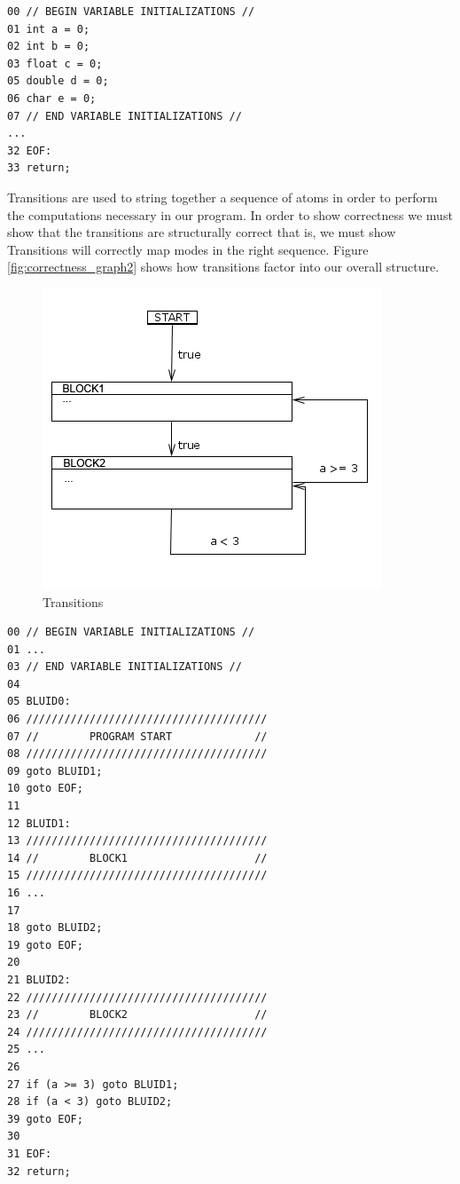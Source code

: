 \begin{lstlisting}[frame=single]
00 // BEGIN VARIABLE INITIALIZATIONS //
01 int a = 0;
02 int b = 0;
03 float c = 0;
05 double d = 0;
06 char e = 0;
07 // END VARIABLE INITIALIZATIONS //
...
32 EOF:
33 return;
\end{lstlisting}

Transitions are used to string together a sequence of atoms in order to perform the computations necessary in our program. In order to show correctness we must show that the transitions are structurally correct that is, we must show Transitions will correctly map modes in the right sequence. Figure \ref{fig:correctness_graph2} shows how transitions factor into our overall structure.

\begin{figure}[h]
	\centering
	\includegraphics[width=\imgmedphoto]{./images/correctness_ex_transition.png}
	\caption{Transitions}
	\label{fig:correctness_ex_transition}
\end{figure}

\begin{lstlisting}[frame=single]
00 // BEGIN VARIABLE INITIALIZATIONS //
01 ...
03 // END VARIABLE INITIALIZATIONS //
04
05 BLUID0:
06 //////////////////////////////////////
07 //        PROGRAM START             //
08 //////////////////////////////////////
09 goto BLUID1;
10 goto EOF;
11
12 BLUID1:
13 //////////////////////////////////////
14 //        BLOCK1                    //
15 //////////////////////////////////////
16 ...
17 
18 goto BLUID2;
19 goto EOF;
20
21 BLUID2:
22 //////////////////////////////////////
23 //        BLOCK2                    //
24 //////////////////////////////////////
25 ...
26
27 if (a >= 3) goto BLUID1;
28 if (a < 3) goto BLUID2;
39 goto EOF;
30
31 EOF:
32 return;
\end{lstlisting}

